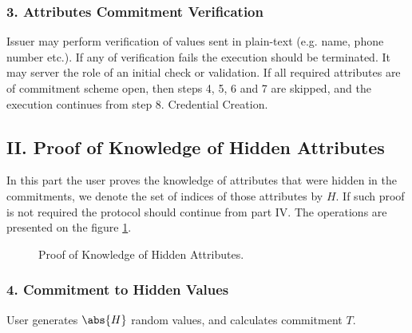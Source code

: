 \subsubsection*{3. Attributes Commitment Verification}

Issuer may perform verification of values sent in plain-text (e.g. name, phone number etc.). If any of verification fails the execution should be terminated. It may server the role of an initial check or validation. If all required attributes are of commitment scheme \textsf{open}, then steps 4, 5, 6 and 7 are skipped, and the execution continues from step 8. Credential Creation.





\subsection*{II. Proof of Knowledge of Hidden Attributes}
In this part the user proves the knowledge of attributes that were hidden in the commitments, we denote the set of indices of those attributes by $H$. If such proof is not required the protocol should continue from part IV. The operations are presented on the figure \ref{tech:issue-protocol-zkp}. 

\begin{figure}[h]
\centering
{}
\caption{Proof of Knowledge of Hidden Attributes.}
\label{tech:issue-protocol-zkp}
\end{figure}

\subsubsection*{4. Commitment to Hidden Values}
User generates $\abs{H}$ random values, and calculates commitment $T$.

